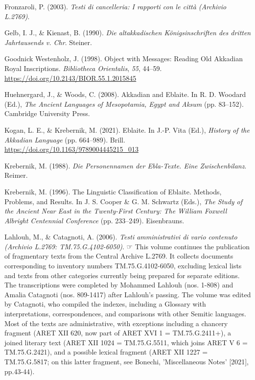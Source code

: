 \documentclass[
]{book}
\newlength{\cslhangindent}
\newlength{\cslentryspacingunit} %
\newenvironment{CSLReferences}[2] %
 {%
  \setlength{\parindent}{0pt}
  \ifodd #1
  \let\oldpar\par
  \def\par{\hangindent=\cslhangindent\oldpar}
  \fi
  \setlength{\parskip}{#2\cslentryspacingunit}
 }%
 {}
\newcommand{\CSLBlock}[1]{#1\hfill\break}
\begin{document}
\begin{CSLReferences}{1}{0}
\leavevmode{}%
Fronzaroli, P. (2003). \emph{{Testi di cancelleria: I rapporti con le citt{à} (Archivio L.2769)}}.

\leavevmode{}%
Gelb, I. J., \& Kienast, B. (1990). \emph{{Die altakkadischen K{ö}nigsinschriften des dritten Jahrtausends v. Chr}}. Steiner.

\leavevmode{}%
Goodnick Westenholz, J. (1998). Object with {Messages}: {Reading Old Akkadian Royal Inscriptions}. \emph{Bibliotheca Orientalis}, \emph{55}, 44--59. \url{https://doi.org/10.2143/BIOR.55.1.2015845}

\leavevmode{}%
Huehnergard, J., \& Woods, C. (2008). Akkadian and {Eblaite}. In R. D. Woodard (Ed.), \emph{The {Ancient Languages} of {Mesopotamia}, {Egypt} and {Aksum}} (pp. 83--152). Cambridge University Press.

\leavevmode{}%
Kogan, L. E., \& Krebernik, M. (2021). Eblaite. In J.-P. Vita (Ed.), \emph{History of the {Akkadian Language}} (pp. 664--989). Brill. \url{https://doi.org/10.1163/9789004445215_013}

\leavevmode{}%
Krebernik, M. (1988). \emph{{Die Personennamen der Ebla-Texte. Eine Zwischenbilanz}}. Reimer.

\leavevmode{}%
Krebernik, M. (1996). The {Linguistic Classification} of {Eblaite}. {Methods}, {Problems}, and {Results}. In J. S. Cooper \& G. M. Schwartz (Eds.), \emph{The {Study} of the {Ancient Near East} in the {Twenty-First Century}: {The William Foxwell Albright Centennial Conference}} (pp. 233--249). Eisenbrauns.

\leavevmode{}%
Lahlouh, M., \& Catagnoti, A. (2006). \emph{{Testi amministrativi di vario contenuto (Archivio L.2769: TM.75.G.4102-6050)}}.
\CSLBlock{\newline☞ This volume continues the publication of fragmentary texts from the Central Archive L.2769. It collects documents corresponding to inventory numbers TM.75.G.4102-6050, excluding lexical lists and texts from other categories currently being prepared for separate editions. The transcriptions were completed by Mohammed Lahlouh (nos. 1-808) and Amalia Catagnoti (nos. 809-1417) after Lahlouh's passing. The volume was edited by Catagnoti, who compiled the indexes, including a Glossary with interpretations, correspondences, and comparisons with other Semitic languages. Most of the texts are administrative, with exceptions including a chancery fragment (ARET XII 620, now part of ARET XVI 1 = TM.75.G.2411+), a joined literary text (ARET XII 1024 = TM.75.G.5511, which joins ARET V 6 = TM.75.G.2421), and a possible lexical fragment (ARET XII 1227 = TM.75.G.5817; on this latter fragment, see Bonechi, 'Miscellaneous Notes' {[}2021{]}, pp.43-44).}


\end{CSLReferences}
\end{document}
